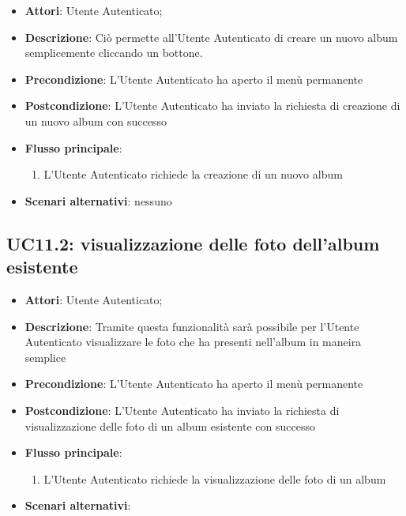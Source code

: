 \begin{itemize}
  \item \textbf{Attori}: Utente Autenticato;
  \item \textbf{Descrizione}: Ciò permette all'Utente Autenticato di creare un
nuovo album semplicemente cliccando un bottone.
  \item \textbf{Precondizione}: L'Utente Autenticato ha aperto il menù
permanente
  \item \textbf{Postcondizione}: L'Utente Autenticato ha inviato la richiesta
di creazione di un nuovo album con successo
  \item \textbf{Flusso principale}:
  \begin{enumerate}
    \item L'Utente Autenticato richiede la creazione di un nuovo album
  \end{enumerate}
  \item \textbf{Scenari alternativi}: nessuno
\end{itemize}



\subsection{UC11.2: visualizzazione delle foto dell'album esistente}
\label{uc:uc11.2}

\begin{itemize}
  \item \textbf{Attori}: Utente Autenticato;
  \item \textbf{Descrizione}: Tramite questa funzionalità sarà possibile per
l'Utente Autenticato visualizzare le foto che ha presenti nell'album in maneira
semplice
  \item \textbf{Precondizione}: L'Utente Autenticato ha aperto il menù
permanente
  \item \textbf{Postcondizione}: L'Utente Autenticato ha inviato la richiesta
di visualizzazione delle foto di un album esistente con successo
  \item \textbf{Flusso principale}:
  \begin{enumerate}
    \item L'Utente Autenticato richiede la visualizzazione delle foto di un
album
  \end{enumerate}
  \item \textbf{Scenari alternativi}: %
\end{itemize}



